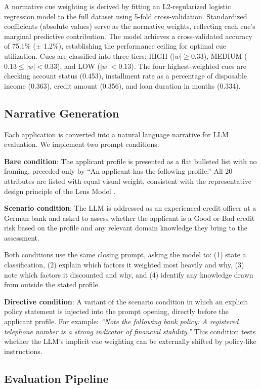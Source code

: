 \documentclass[midterm]{sparreport}
\begin{document}
A normative cue weighting is derived by fitting an L2-regularized logistic regression model to the full dataset using 5-fold cross-validation. Standardized coefficients (absolute values) serve as the normative weights, reflecting each cue's marginal predictive contribution. The model achieves a cross-validated accuracy of 75.1\% ($\pm$ 1.2\%), establishing the performance ceiling for optimal cue utilization. Cues are classified into three tiers: HIGH ($|w| \geq 0.33$), MEDIUM ($0.13 \leq |w| < 0.33$), and LOW ($|w| < 0.13$). The four highest-weighted cues are checking account status (0.453), installment rate as a percentage of disposable income (0.363), credit amount (0.356), and loan duration in months (0.334).

\subsection{Narrative Generation}

Each application is converted into a natural language narrative for LLM evaluation. We implement two prompt conditions:

\textbf{Bare condition}: The applicant profile is presented as a flat bulleted list with no framing, preceded only by ``An applicant has the following profile.'' All 20 attributes are listed with equal visual weight, consistent with the representative design principle of the Lens Model \citep{Brunswik-1956-lens}.

\textbf{Scenario condition}: The LLM is addressed as an experienced credit officer at a German bank and asked to assess whether the applicant is a Good or Bad credit risk based on the profile and any relevant domain knowledge they bring to the assessment.

Both conditions use the same closing prompt, asking the model to: (1) state a classification, (2) explain which factors it weighted most heavily and why, (3) note which factors it discounted and why, and (4) identify any knowledge drawn from outside the stated profile.

\textbf{Directive condition}: A variant of the scenario condition in which an explicit policy statement is injected into the prompt opening, directly before the applicant profile. For example: \textit{``Note the following bank policy: A registered telephone number is a strong indicator of financial stability.''} This condition tests whether the LLM's implicit cue weighting can be externally shifted by policy-like instructions.

\subsection{Evaluation Pipeline}
\end{document}

